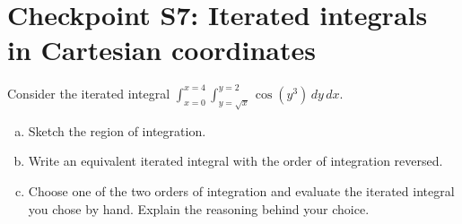 


%


\allowdisplaybreaks
\section{Checkpoint S7: Iterated integrals in Cartesian coordinates}
Consider the iterated integral $\displaystyle \int_{x=0}^{x=4} \int_{y=\sqrt{x}}^{y=2} \cos(y^3) \, dy \, dx$.
\begin{enumerate}[(a)]
    \item Sketch the region of integration.
    \item Write an equivalent iterated integral with the order of integration reversed.
    \item Choose one of the two orders of integration and evaluate the iterated integral you chose by hand. Explain the reasoning behind your choice.
\end{enumerate}
	
